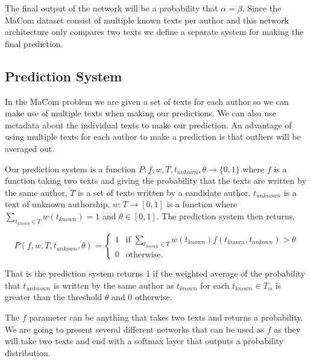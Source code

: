 The final output of the network will be a probability that $\alpha = \beta$.
Since the MaCom dataset consist of multiple known texts per author and this
network architecture only compares two texts we define a separate system for
making the final prediction.

\subsection{Prediction System}\label{sec:prediction}

In the MaCom problem we are given a set of texts for each author so we can make
use of multiple texts when making our predictions. We can also use metadata
about the individual texts to make our prediction. An advantage of using
multiple texts for each author to make a prediction is that outliers will be
averaged out.

\begin{definition}

    \label{def:prediction_system}

    Our prediction system is a function $P:f, w, T, t_{unkown}, \theta
    \rightarrow \{0, 1\}$ where $f$ is a function taking two texts and giving
    the probability that the texts are written by the same author, $T$ is a set
    of texts written by a candidate author, $t_{unknown}$ is a text of unknown
    authorship, $w:T \rightarrow [0,1]$ is a function where $\sum_{t_{known}
    \in T} w(t_{known}) = 1$ and $\theta \in [0,1]$. The prediction system then
    returns,

    \begin{equation}
        P(f, w, T, t_{unkown}, \theta) = \begin{cases}
            1 & \text{if } \sum_{t_{known} \in T} w(t_{known})
                f(t_{known}, t_{unkown}) > \theta \\
            0 & \text{otherwise}.
        \end{cases}
    \end{equation}

\end{definition}

That is the prediction system returns 1 if the weighted average of the
probability that $t_{unknown}$ is written by the same author as $t_{known}$
for each $t_{known} \in T_\alpha$ is greater than the threshold $\theta$ and 0
otherwise.

The $f$ parameter can be anything that takes two texts and returns a
probability. We are going to present several different networks that can be used
as $f$ as they will take two texts and end with a softmax layer that outputs a
probability distribution.

